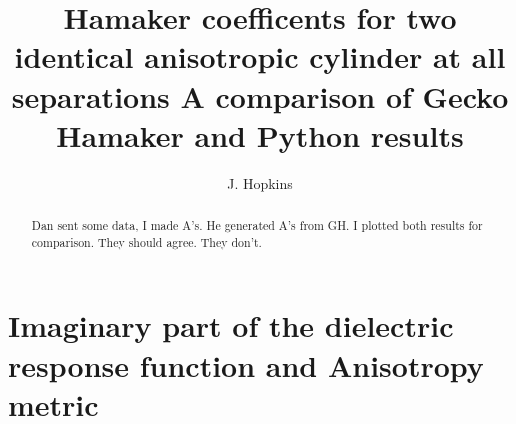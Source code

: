 \documentclass[onecolumn,letterpaper,amsmath,amssymb,floatfix,aps,superscriptaddress]{revtex4}
\begin{document}
\title{\bf Hamaker coefficents for two identical anisotropic cylinder at all separations
A comparison of Gecko Hamaker and Python results} 

\author{J. Hopkins}
    
\begin{abstract}
Dan sent some data, I made A's. He generated A's from GH. I plotted both results for comparison. They should agree. They don't.
\end{abstract}

\maketitle        

\section{Imaginary part of the dielectric response function and Anisotropy metric}
\end{document}

